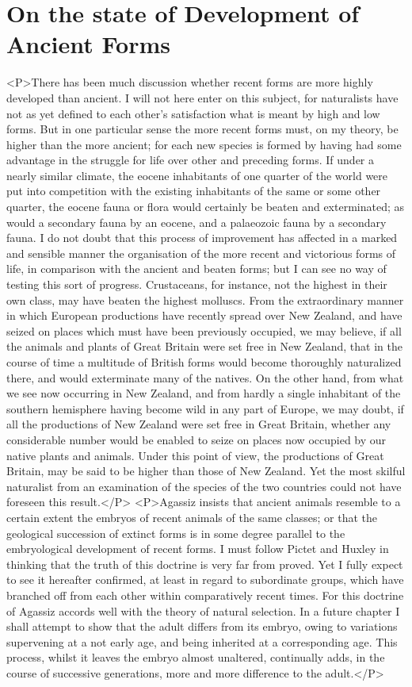 \section{On the state of Development of Ancient Forms}
<P>There has been much discussion whether recent forms are more highly developed than ancient. I will not here enter on this subject, for naturalists have not as yet defined to each other's satisfaction what is meant by high and low forms.  But in one particular sense the more recent forms must, on my theory, be higher than the more ancient; for each new species is formed by having had some advantage in the struggle for life over other and preceding forms. If under a nearly similar climate, the eocene inhabitants of one quarter of the world were put into competition with the existing inhabitants of the same or some other quarter, the eocene fauna or flora would certainly be beaten and exterminated; as would a secondary fauna by an eocene, and a palaeozoic fauna by a secondary fauna. I do not doubt that this process of improvement has affected in a marked and sensible manner the organisation of the more recent and victorious forms of life, in comparison with the ancient and beaten forms; but I can see no way of testing this sort of progress.  Crustaceans, for instance, not the highest in their own class, may have beaten the highest molluscs. From the extraordinary manner in which European productions have recently spread over New Zealand, and have seized on places which must have been previously occupied, we may believe, if all the animals and plants of Great Britain were set free in New Zealand, that in the course of time a multitude of British forms would become thoroughly naturalized there, and would exterminate many of the natives. On the other hand, from what we see now occurring in New Zealand, and from hardly a single inhabitant of the southern hemisphere having become wild in any part of Europe, we may doubt, if all the productions of New Zealand were set free in Great Britain, whether any considerable number would be enabled to seize on places now occupied by our native plants and animals.  Under this point of view, the productions of Great Britain, may be said to be higher than those of New Zealand. Yet the most skilful naturalist from an examination of the species of the two countries could not have foreseen this result.</P>
<P>Agassiz insists that ancient animals resemble to a certain extent the embryos of recent animals of the same classes; or that the geological succession of extinct forms is in some degree parallel to the embryological development of recent forms. I must follow Pictet and Huxley in thinking that the truth of this doctrine is very far from proved. Yet I fully expect to see it hereafter confirmed, at least in regard to subordinate groups, which have branched off from each other within comparatively recent times. For this doctrine of Agassiz accords well with the theory of natural selection. In a future chapter I shall attempt to show that the adult differs from its embryo, owing to variations supervening at a not early age, and being inherited at a corresponding age. This process, whilst it leaves the embryo almost unaltered, continually adds, in the course of successive generations, more and more difference to the adult.</P>
